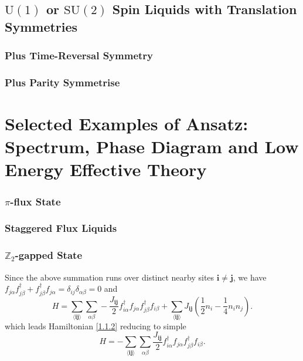 \documentclass[10pt,nofootinbib]{revtex4}
\begin{document}
	\subsection{$\mathrm{U}(1)$ or $\mathrm{SU}(2)$ Spin Liquids with Translation Symmetries}
	\subsubsection{Plus Time-Reversal Symmetry}
	\subsubsection{Plus Parity Symmetrise}

\section{Selected Examples of Ansatz: Spectrum, Phase Diagram and Low Energy Effective Theory}
		\subsubsection{$\pi$-flux State}

		\subsubsection{Staggered Flux Liquids}

		\subsubsection{$\mathbb{Z}_2$-gapped State}


\iffalse
	Since the above summation runs over distinct nearby sites $\bm{i}\neq\bm{j}$, we have $f_{j \alpha}f_{j \beta}^\dagger+f_{j \beta}^\dagger f_{j \alpha}=\delta_{ij}\delta_{\alpha \beta}=0$ and
	\begin{equation}\label{1.1.2}
		H=\sum_{\langle\bm{ij}\rangle}\sum_{\alpha \beta}-\dfrac{J_{\bm{ij}}}{2}f_{i \alpha}^\dagger f_{j \alpha} f_{j \beta}^\dagger f_{i \beta}+\sum_{\langle\bm{ij}\rangle}J_{\bm{ij}} \left(\dfrac{1}{2}n_i-\dfrac{1}{4}n_i n_j\right).
	\end{equation}
	which leads Hamiltonian \eqref{1.1.2} reducing to simple
	\begin{equation}\label{1.1.4}
		H=-\sum_{\langle\bm{ij}\rangle}\sum_{\alpha \beta}\dfrac{J_{\bm{ij}}}{2}f_{i \alpha}^\dagger f_{j \alpha} f_{j \beta}^\dagger f_{i \beta}.
	\end{equation}
\end{document}
